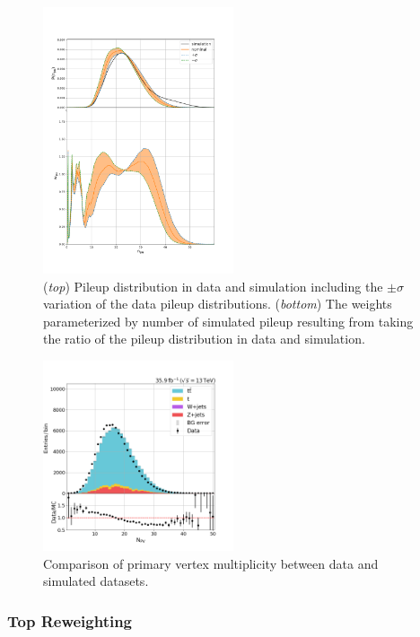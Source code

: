 \begin{figure}[ht]
    \centering
    \includegraphics[width=0.5\textwidth]{chapters/Analysis/sectionDataset/figures/pileup_systematics.pdf}
    \caption{(\emph{top}) Pileup distribution in data and simulation including the $\pm\sigma$ variation of the data pileup distributions. (\emph{bottom}) The weights parameterized by number of simulated pileup resulting from taking the ratio of the pileup distribution in data and simulation.}
    \label{fig:analysis:dataset:pileup}
\end{figure}

\begin{figure}[ht]
    \centering
    \includegraphics[width=0.5\textwidth]{chapters/Analysis/sectionDataset/figures/n_pv}
    \caption{Comparison of primary vertex multiplicity between data and simulated datasets.}
    \label{fig:analysis:dataset:npv}
\end{figure}
\FloatBarrier


\subsubsection{Top \pt Reweighting}

